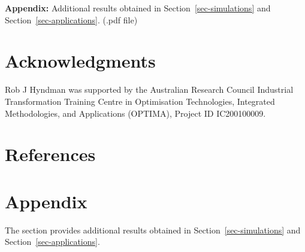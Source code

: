 \documentclass[
  11pt]{article}
\theoremstyle{plain}
\theoremstyle{remark}
\begin{document}
\textbf{Appendix:} Additional results obtained in
Section~\ref{sec-simulations} and Section~\ref{sec-applications}. (.pdf
file)

\section*{Acknowledgments}\label{acknowledgments}

Rob J Hyndman was supported by the Australian Research Council
Industrial Transformation Training Centre in Optimisation Technologies,
Integrated Methodologies, and Applications (OPTIMA), Project ID
IC200100009.

\section*{References}\label{references}

\renewcommand{\bibsection}{}


\newpage
\appendix
{}%
\setcounter{section}{0}
\renewcommand{\thesection}{\Alph{section}}
\renewcommand{\thefigure}{A\arabic{figure}}
\renewcommand{\thetable}{A\arabic{table}}
\setcounter{figure}{0}
\setcounter{table}{0}

\section*{Appendix}\label{appendix}

The section provides additional results obtained in
Section~\ref{sec-simulations} and Section~\ref{sec-applications}.
\end{document}
